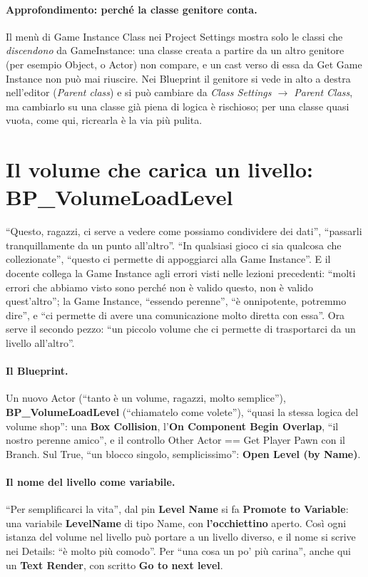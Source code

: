 \paragraph{Approfondimento: perché la classe genitore conta.} Il menù di Game Instance
Class nei Project Settings mostra solo le classi che \emph{discendono} da GameInstance:
una classe creata a partire da un altro genitore (per esempio Object, o Actor) non
compare, e un cast verso di essa da Get Game Instance non può mai riuscire. Nei Blueprint
il genitore si vede in alto a destra nell'editor (\emph{Parent class}) e si può cambiare
da \emph{Class Settings $\rightarrow$ Parent Class}, ma cambiarlo su una classe già piena
di logica è rischioso; per una classe quasi vuota, come qui, ricrearla è la via più
pulita.

\section{Il volume che carica un livello: BP\_VolumeLoadLevel}
\label{ue8:sec:loadlevel}

``Questo, ragazzi, ci serve a vedere come possiamo condividere dei dati'', ``passarli
tranquillamente da un punto all'altro''. ``In qualsiasi gioco ci sia qualcosa che
collezionate'', ``questo ci permette di appoggiarci alla Game Instance''. E il docente
collega la Game Instance agli errori visti nelle lezioni precedenti: ``molti errori che
abbiamo visto sono perché non è valido questo, non è valido quest'altro''; la Game
Instance, ``essendo perenne'', ``è onnipotente, potremmo dire'', e ``ci permette di avere
una comunicazione molto diretta con essa''. Ora serve il secondo pezzo: ``un piccolo
volume che ci permette di trasportarci da un livello all'altro''.

\paragraph{Il Blueprint.} Un nuovo Actor (``tanto è un volume, ragazzi, molto semplice''),
\textbf{BP\_VolumeLoadLevel} (``chiamatelo come volete''), ``quasi la stessa logica del
volume shop'': una \textbf{Box Collision}, l'\textbf{On Component Begin Overlap},
``il nostro perenne amico'', e il controllo Other Actor == Get Player Pawn con il
Branch. Sul True, ``un blocco singolo, semplicissimo'': \textbf{Open Level (by Name)}.

\paragraph{Il nome del livello come variabile.} ``Per semplificarci la vita'', dal pin
\textbf{Level Name} si fa \textbf{Promote to Variable}: una variabile \textbf{LevelName}
di tipo Name, con \textbf{l'occhiettino} aperto. Così ogni istanza del volume nel livello
può portare a un livello diverso, e il nome si scrive nei Details: ``è molto più
comodo''. Per ``una cosa un po' più carina'', anche qui un \textbf{Text Render}, con
scritto \textbf{Go to next level}.

